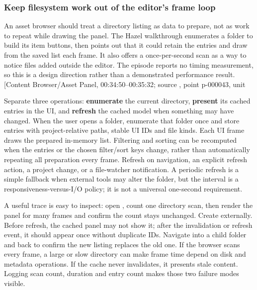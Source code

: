 \subsubsection{Keep filesystem work out of the editor's frame loop}\label{06-engine-ii-ch027-keep-filesystem-work-out-of-the-editors-frame-loop}

\hypertarget{06-engine-ii-ch027-keep-filesystem-work-out-of-the-editors-frame-loop}{}

An asset browser should treat a directory listing as data to prepare, not as work to repeat while drawing the panel. The Hazel walkthrough enumerates a folder to build its item buttons, then points out that it could retain the entries and draw from the saved list each frame. It also offers a once-per-second scan as a way to notice files added outside the editor. The episode reports no timing measurement, so this is a design direction rather than a demonstrated performance result. {[}Content Browser/Asset Panel, 00:34:50--00:35:32; source , point p-000043, unit \BookInlineCode{u-7cacdd05265ba993707afb39}{]}

Separate three operations: \textbf{enumerate} the current directory, \textbf{present} its cached entries in the UI, and \textbf{refresh} the cached model when something may have changed. When the user opens a folder, enumerate that folder once and store entries with project-relative paths, stable UI IDs and file kinds. Each UI frame draws the prepared in-memory list. Filtering and sorting can be recomputed when the entries or the chosen filter/sort keys change, rather than automatically repeating all preparation every frame. Refresh on navigation, an explicit refresh action, a project change, or a file-watcher notification. A periodic refresh is a simple fallback when external tools may alter the folder, but the interval is a responsiveness-versus-I/O policy; it is not a universal one-second requirement.

A useful trace is easy to inspect: open , count one directory scan, then render the panel for many frames and confirm the count stays unchanged. Create  externally. Before refresh, the cached panel may not show it; after the invalidation or refresh event, it should appear once without duplicate IDs. Navigate into a child folder and back to confirm the new listing replaces the old one. If the browser scans every frame, a large or slow directory can make frame time depend on disk and metadata operations. If the cache never invalidates, it presents stale content. Logging scan count, duration and entry count makes those two failure modes visible.

